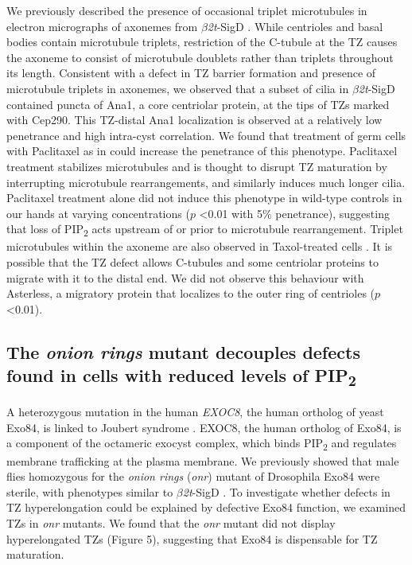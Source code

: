 \documentclass[12pt, twoside, letterpaper]{article}
\newcommand{\PIP}{PIP\textsubscript{2}}
\newcommand{\sigd}{$\beta$\textit{2t}-SigD}
\begin{document}
We previously described the presence of occasional triplet microtubules
in electron micrographs of axonemes from \sigd{} \citep{wei2008depletion}.
While centrioles and basal bodies contain microtubule triplets,
restriction of the C-tubule at the TZ causes the axoneme to
consist of microtubule doublets rather than triplets throughout its length.
Consistent with a defect in TZ barrier formation and presence of
microtubule triplets in axonemes,
we observed that a subset of cilia in \sigd{}
contained puncta of Ana1, a core centriolar protein, at the tips
of TZs marked with Cep290.
This TZ-distal Ana1 localization is observed at a relatively low penetrance
and high intra-cyst correlation.
We found that treatment of germ cells with Paclitaxel as in \citep{riparbelli2013unique}
could increase the penetrance of this phenotype.
Paclitaxel treatment stabilizes microtubules and is thought to disrupt TZ maturation
by interrupting microtubule rearrangements, and similarly induces much longer cilia.
Paclitaxel treatment alone did not induce this phenotype in wild-type controls in our hands
at varying concentrations ($p$ <0.01 with 5\% penetrance),
suggesting that loss of \PIP{} acts upstream of or prior to microtubule rearrangement.
Triplet microtubules within the axoneme are also observed in Taxol-treated cells \citep{riparbelli2013unique}.
It is possible that the TZ defect allows C-tubules and some centriolar proteins
to migrate with it to the distal end.
We did not observe this behaviour with Asterless,
a migratory protein that localizes to the outer
ring of centrioles ($p$ <0.01).

\subsection{The \textit{onion rings} mutant decouples defects found in cells with reduced levels of \PIP{}}
A heterozygous mutation in the human \textit{EXOC8},
the human ortholog of yeast Exo84, is linked to
Joubert syndrome \citep{dixon2012exome}.
EXOC8, the human ortholog of Exo84, is a component of the octameric exocyst complex, which binds
\PIP{} and regulates membrane trafficking at the plasma membrane.
We previously showed that male flies homozygous for the \textit{onion rings}
(\textit{onr}) mutant of Drosophila Exo84 were sterile, with phenotypes
similar to \sigd{} \citep{wei2008depletion}.
To investigate whether defects in TZ hyperelongation could be explained by
defective Exo84 function, we examined TZs in \textit{onr} mutants.
We found that the \textit{onr} mutant did not display hyperelongated TZs (Figure 5),
suggesting that Exo84 is dispensable for TZ maturation.
\end{document}

